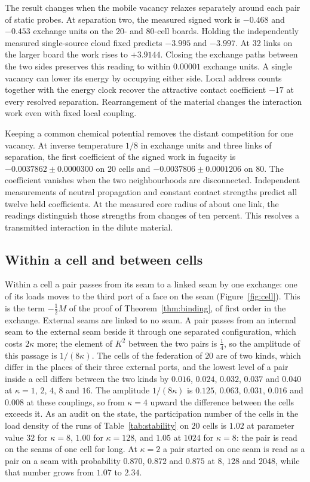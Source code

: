 \documentclass[11pt]{article}
\theoremstyle{definition}
\theoremstyle{remark}
\theoremstyle{plain}
\begin{document}
The result changes when the mobile vacancy relaxes separately around each
pair of static probes. At separation two, the measured signed work is
$-0.468$ and $-0.453$ exchange units on the 20- and 80-cell boards.
Holding the independently measured single-source cloud fixed predicts
$-3.995$ and $-3.997$. At 32 links on the larger board the work rises
to $+3.9144$. Closing the exchange paths between the two sides preserves
this reading to within $0.00001$ exchange units. A single vacancy can
lower its energy by occupying either side. Local address counts together
with the energy clock recover the attractive contact coefficient $-17$
at every resolved separation. Rearrangement of the material changes
the interaction work even with fixed local coupling.

Keeping a common chemical potential removes the distant competition for
one vacancy. At inverse temperature $1/8$ in exchange units and three
links of separation, the first coefficient of the signed work in fugacity
is $-0.0037862\pm0.0000300$ on 20 cells and
$-0.0037806\pm0.0001206$ on 80. The coefficient vanishes when the two
neighbourhoods are disconnected. Independent measurements of neutral
propagation and constant contact strengths predict all twelve held
coefficients. At the measured core radius of about one link, the
readings distinguish those strengths from changes of ten percent.
This resolves a transmitted interaction in the dilute material.

\subsection{Within a cell and between cells}

Within a cell a pair passes from its seam to a linked seam by one exchange:
one of its loads moves to the third port of a face on the seam
(Figure~\ref{fig:cell}). This is the term $-\tfrac12M$ of the proof of
Theorem~\ref{thm:binding}, of first order in the exchange. External seams
are linked to no seam. A pair passes from an internal seam to the external
seam beside it through one separated configuration, which costs $2\kappa$
more; the element of $K^{2}$ between the two pairs is $\tfrac14$, so the
amplitude of this passage is $1/(8\kappa)$. The cells of the federation of
$20$ are of two kinds, which differ in the places of their three external
ports, and the lowest level of a pair inside a cell differs between the two
kinds by $0.016$, $0.024$, $0.032$, $0.037$ and $0.040$ at $\kappa=1$, $2$,
$4$, $8$ and $16$. The amplitude $1/(8\kappa)$ is $0.125$, $0.063$, $0.031$,
$0.016$ and $0.008$ at these couplings, so from $\kappa=4$ upward the
difference between the cells exceeds it. As an audit on the state, the
participation number of the cells in the load density of the runs of
Table~\ref{tab:stability} on $20$ cells is $1.02$ at parameter value $32$
for $\kappa=8$, $1.00$ for $\kappa=128$, and $1.05$ at $1024$ for
$\kappa=8$: the pair is read on the seams of one cell for long. At
$\kappa=2$ a pair started on one seam is read as a pair on a seam with
probability $0.870$, $0.872$ and $0.875$ at $8$, $128$ and $2048$, while
that number grows from $1.07$ to $2.34$.
\end{document}
